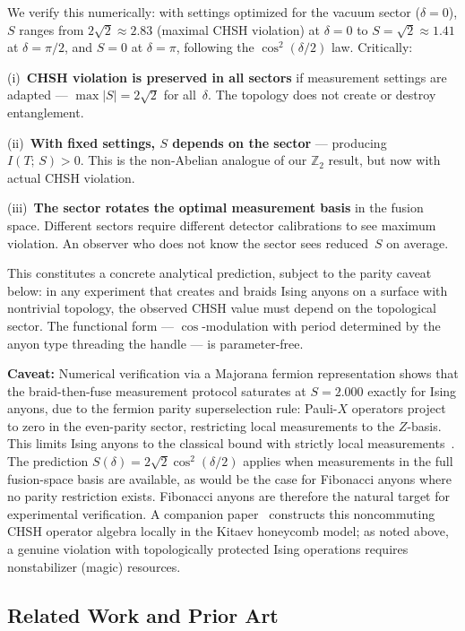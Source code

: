 \documentclass[aps,pra,twocolumn,superscriptaddress,showpacs,floatfix]{revtex4-2}
\newcommand{\Ztwo}{\mathbb{Z}_2}
\newcommand{\MI}{I(T;\,S)}
\begin{document}
We verify this numerically: with settings optimized for the vacuum sector
($\delta = 0$), $S$ ranges from $2\sqrt{2} \approx 2.83$ (maximal CHSH violation)
at $\delta = 0$ to $S = \sqrt{2} \approx 1.41$ at $\delta = \pi/2$, and $S = 0$
at $\delta = \pi$, following the $\cos^2(\delta/2)$ law. Critically:

(i)~\textbf{CHSH violation is preserved in all sectors} if measurement settings
are adapted --- $\max|S| = 2\sqrt{2}$ for all~$\delta$. The topology does not
create or destroy entanglement.

(ii)~\textbf{With fixed settings, $S$ depends on the sector} --- producing
$\MI > 0$. This is the non-Abelian analogue of our $\Ztwo$ result, but now with
actual CHSH violation.

(iii)~\textbf{The sector rotates the optimal measurement basis} in the fusion
space. Different sectors require different detector calibrations to see maximum
violation. An observer who does not know the sector sees reduced~$S$ on average.

This constitutes a concrete analytical prediction, subject to the parity caveat
below: in any experiment that
creates and braids Ising anyons on a surface with nontrivial topology, the
observed CHSH value must depend on the topological sector. The functional form ---
$\cos$-modulation with period determined by the anyon type threading the handle
--- is parameter-free.

\textbf{Caveat:} Numerical verification via a Majorana fermion representation
shows that the braid-then-fuse measurement protocol saturates at $S = 2.000$
exactly for Ising anyons, due to the fermion parity superselection rule:
Pauli-$X$ operators project to zero in the even-parity sector, restricting local
measurements to the $Z$-basis. This limits Ising anyons to the classical bound with
strictly local measurements~\cite{HowardVala2012}. The prediction
$S(\delta) = 2\sqrt{2}\cos^2(\delta/2)$ applies when measurements in the full
fusion-space basis are available, as would be the case for Fibonacci anyons where
no parity restriction exists. Fibonacci anyons are therefore the natural target for
experimental verification. A companion paper~\cite{Sayim2026cbell}
constructs this noncommuting CHSH operator algebra locally in the Kitaev
honeycomb model; as noted above, a genuine violation with topologically
protected Ising operations requires nonstabilizer (magic) resources.

\subsection{Related Work and Prior Art}
\label{sec:related_work}
\end{document}
